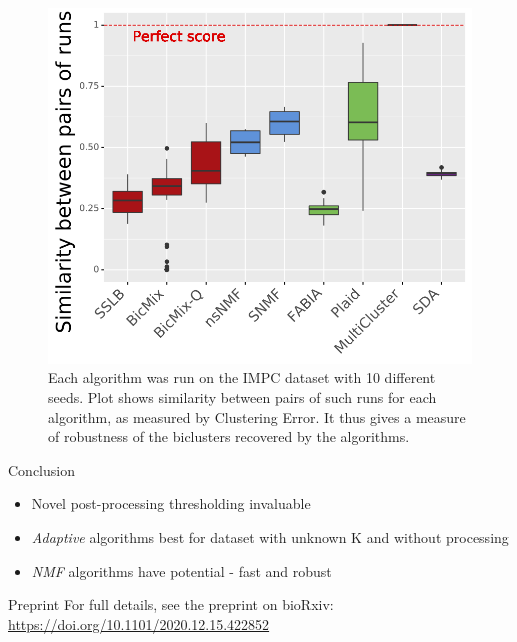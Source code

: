 \documentclass[xcolor=table,final]{beamer}
\newlength{\onecolwid}
\begin{document}
\begin{frame}[t]
\begin{columns}[t]
\begin{column}{\onecolwid}
\begin{figure}
\includegraphics[width=\textwidth]{plots/similarity_methods_K.png}
\caption{Each algorithm was run on the IMPC dataset with 10 different seeds. Plot shows similarity between pairs of such runs for each algorithm, as measured by Clustering Error. It thus gives a measure of robustness of the biclusters recovered by the algorithms.}
\end{figure}


\begin{block}{Conclusion}

\begin{itemize}
    \item Novel post-processing thresholding invaluable
    \item \textit{Adaptive} algorithms best for dataset with unknown K and without processing
    \item \textit{NMF} algorithms have potential - fast and robust
\end{itemize}

\end{block}

\begin{alertblock}{Preprint}
For full details, see the preprint on bioRxiv: \\
\small \url{https://doi.org/10.1101/2020.12.15.422852}
\end{alertblock}


\end{column}
\end{columns}
\end{frame}
\end{document}
